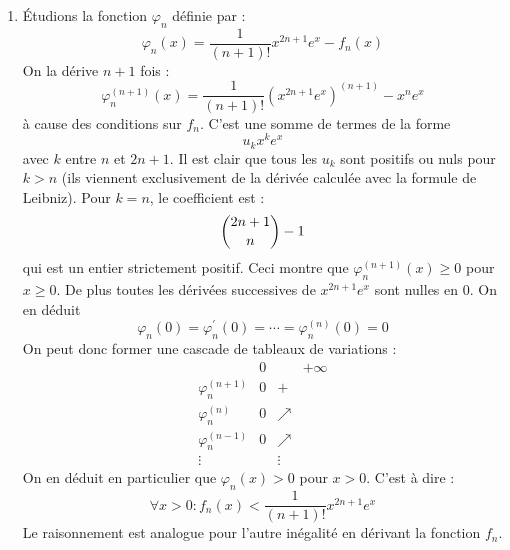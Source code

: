 \begin{enumerate}
\begin{enumerate}
\item \'Etudions la fonction $\varphi_n$ définie par :
\begin{displaymath}
 \varphi_n (x) =\dfrac{1}{(n+1)!}x^{2n+1}e^x-f_n(x)
\end{displaymath}
On la dérive $n+1$ fois :
\begin{displaymath}
 \varphi_n^{(n+1)} (x) =\dfrac{1}{(n+1)!}\left( x^{2n+1}e^x\right) ^{(n+1)}-x^n e^x
\end{displaymath}
à cause des conditions sur $f_n$. C'est une somme de termes de la forme
\begin{displaymath}
 u_kx^k e^x
\end{displaymath}
avec $k$ entre $n$ et $2n+1$. Il est clair que tous les $u_k$ sont positifs ou nuls pour $k>n$ (ils viennent exclusivement de la dérivée calculée avec la formule de Leibniz). Pour $k=n$, le coefficient est :
\begin{displaymath}
 \dbinom{2n+1}{n} -1
\end{displaymath}
qui est un entier strictement positif. Ceci montre que $\varphi_n^{(n+1)} (x)\geq 0$ pour $x\geq 0$. De plus toutes les dérivées successives de $x^{2n+1}e^x$ sont nulles en 0. On en déduit
\begin{displaymath}
 \varphi_n (0)=\varphi_n^{\prime}(0)= \cdots =\varphi_n^{(n)} (0)=0
\end{displaymath}
On peut donc former une cascade de tableaux de variations :
\begin{displaymath}
 \begin{array}{l|lcr|}
 & 0 & & +\infty \\ \hline 
\varphi_n^{(n+1)} & 0 & + & \\ \hline 
\varphi_n^{(n)} & 0 & \nearrow & \\ \hline 
\varphi_n^{(n-1)} & 0 & \nearrow & \\ \hline
\vdots &  & \vdots &  
\end{array}
\end{displaymath}
On en déduit en particulier que $\varphi_n(x)>0$ pour $x>0$. C'est à dire :
\begin{displaymath}
 \forall x>0 : f_n(x) < \dfrac{1}{(n+1)!}x^{2n+1}e^{x}
\end{displaymath}
Le raisonnement est analogue pour l'autre inégalité en dérivant la fonction $f_n$.
\end{enumerate}


\end{enumerate}

